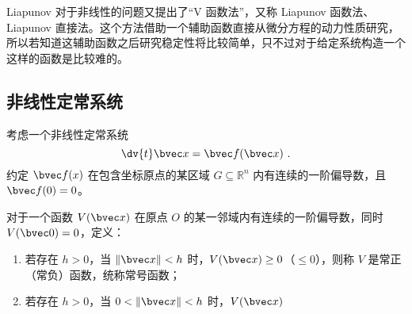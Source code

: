 
Liapunov 对于非线性的问题又提出了“V 函数法”，又称 Liapunov 函数法、Liapunov 直接法。这个方法借助一个辅助函数直接从微分方程的动力性质研究，所以若知道这辅助函数之后研究稳定性将比较简单，只不过对于给定系统构造一个这样的函数是比较难的。



\subsection{非线性定常系统}
考虑一个非线性定常系统 
\begin{equation}
\dv{t} \bvec x = \bvec f(\bvec x) ~.
\end{equation}
约定 $\bvec f(x)$ 在包含坐标原点的某区域 $G \subseteq \mathbb R^n$ 内有连续的一阶偏导数，且 $\bvec f(0) = 0$。

\begin{definition}{}
对于一个函数 $ V(\bvec x)$ 在原点 $O$ 的某一邻域内有连续的一阶偏导数，同时 $ V(\bvec 0 ) = 0$，定义：
\begin{enumerate}
\item 若存在 $h>0$，当 $\Vert \bvec x \Vert < h$ 时，$V(\bvec x) \ge 0$（$\le 0$），则称 $V$ 是常正（常负）函数，统称常号函数；
\item 若存在 $h > 0$，当 $0 < \Vert \bvec x \Vert < h$ 时，$V(\bvec x)$
\end{enumerate}

\end{definition}